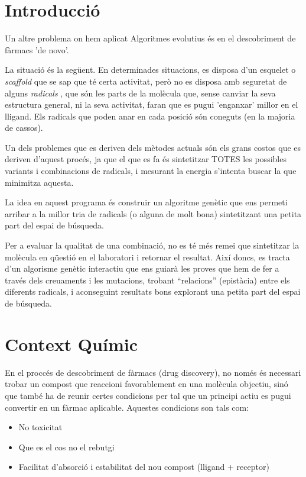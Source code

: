 \documentclass[titlepage,a4paper,12pt]{book}
\begin{document}
\section{Introducció} %
	\label{sec:Introduccio}
	Un altre problema on hem aplicat Algoritmes evolutius és en el descobriment
	de fàrmacs 'de novo'.

	La situació és la següent.  En determinades situacions, es disposa d'un
	esquelet o \textit{scaffold} que se sap que té certa activitat, però no es
	disposa amb seguretat de alguns \textit{radicals} , que són les parts de la
	molècula que, sense canviar la seva estructura general, ni la seva
	activitat, faran que es pugui 'enganxar' millor en el lligand.  Els radicals
	que poden anar en cada posició són coneguts (en la majoria de cassos).

	Un dels problemes que es deriven dels mètodes actuals són els grans costos
	que es deriven d'aquest procés, ja que el que es fa és sintetitzar TOTES les
possibles variants i combinacions de radicals, i mesurant la energia %
	s'intenta buscar la que minimitza aquesta.

	La idea en aquest programa és construir un algoritme genètic que ens permeti
	arribar a la millor tria de radicals (o alguna de molt bona) sintetitzant
	una petita part del espai de búsqueda.

	Per a evaluar la qualitat de una combinació, no es té més remei que
	sintetitzar la molècula en qüestió en el laboratori i retornar el resultat.
	Així doncs, es tracta d'un algorisme genètic interactiu %
	que ens guiarà les proves que hem de fer a través dels creuaments i les
	mutacions, trobant ``relacions'' (epistàcia) entre els diferents radicals, i
	aconseguint resultats bons explorant una petita part del espai de búsqueda.

\section{Context Químic} %
	\label{sec:Context Quimic}

	En el proccés de descobriment de fàrmacs (drug discovery), no només és
	necessari trobar un compost que reaccioni favorablement en una molècula
	objectiu, sinó que també ha de reunir certes condicions per tal que un
	principi actiu es pugui convertir en un fàrmac aplicable.  Aquestes
	condicions son tals com:

	\begin{itemize}
	\item No toxicitat
	\item Que es el cos no el rebutgi
	\item Facilitat d'absorció i estabilitat del nou compost (lligand +
			receptor)
	\end{itemize}
\end{document}
